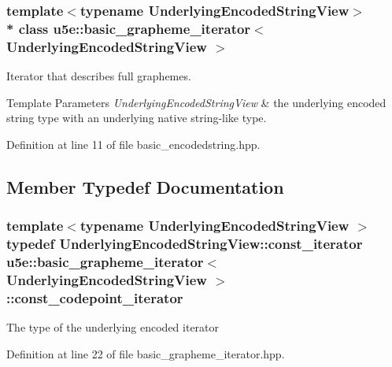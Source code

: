 \subsubsection*{template$<$typename Underlying\+Encoded\+String\+View$>$\\*
class u5e\+::basic\+\_\+grapheme\+\_\+iterator$<$ Underlying\+Encoded\+String\+View $>$}

Iterator that describes full graphemes. 


\begin{DoxyTemplParams}{Template Parameters}
{\em Underlying\+Encoded\+String\+View} & the underlying encoded string type with an underlying native string-\/like type. \\
\hline
\end{DoxyTemplParams}


Definition at line 11 of file basic\+\_\+encodedstring.\+hpp.



\subsection{Member Typedef Documentation}
\subsubsection[{\texorpdfstring{const\+\_\+codepoint\+\_\+iterator}{const_codepoint_iterator}}]{\setlength{\rightskip}{0pt plus 5cm}template$<$typename Underlying\+Encoded\+String\+View $>$ typedef Underlying\+Encoded\+String\+View\+::const\+\_\+iterator {\bf u5e\+::basic\+\_\+grapheme\+\_\+iterator}$<$ Underlying\+Encoded\+String\+View $>$\+::{\bf const\+\_\+codepoint\+\_\+iterator}}\hypertarget{classu5e_1_1basic__grapheme__iterator_a3fd90c1a24fccf790b94199950339846}{}\label{classu5e_1_1basic__grapheme__iterator_a3fd90c1a24fccf790b94199950339846}
The type of the underlying encoded iterator 

Definition at line 22 of file basic\+\_\+grapheme\+\_\+iterator.\+hpp.

